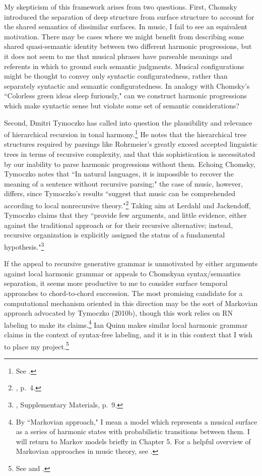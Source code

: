 My skepticism of this framework arises from two questions.  First, Chomsky introduced the separation of deep structure from surface structure to account for the shared semantics of dissimilar surfaces.  In music, I fail to see an equivalent motivation.  There may be cases where we might benefit from describing some shared quasi-semantic identity between two different harmonic progressions, but it does not seem to me that musical phrases have parseable meanings and referents in which to ground such semantic judgments.  Musical configurations might be thought to convey only syntactic configuratedness, rather than separately syntactic and semantic configuratedness.  In analogy with Chomsky's ``Colorless green ideas sleep furiously," can we construct harmonic progressions which make syntactic sense but violate some set of semantic considerations?

Second, Dmitri Tymoczko has called into question the plausibility and relevance of hierarchical recursion in tonal harmony.\footnote{See \cite{tymoczko2010local}.}  He notes that the hierarchical tree structures required by parsings like Rohrmeier's greatly exceed accepted linguistic trees in terms of recursive complexity, and that this sophistication is necessitated by our inability to parse harmonic progressions without them.  Echoing Chomsky, Tymoczko notes that ``In natural languages, it is impossible to recover the meaning of a sentence without recursive parsing;" the case of music, however, differs, since Tymoczko's results ``suggest that music can be comprehended according to local nonrecursive theory."\footnote{\cite{tymoczko2010local}, p.\ 4.}  Taking aim at Lerdahl and Jackendoff, Tymoczko claims that they ``provide few arguments, and little evidence, either against the traditional approach or for their recursive alternative; instead, recursive organization is explicitly assigned the status of a fundamental hypothesis."\footnote{\cite{tymoczko2010local}, Supplementary Materials, p.\ 9.}

If the appeal to recursive generative grammar is unmotivated by either arguments against local harmonic grammar or appeals to Chomskyan syntax/semantics separation, it seems more productive to me to consider surface temporal approaches to chord-to-chord succession.  The most promising candidate for a computational mechanism oriented in this direction may be the sort of Markovian approach advocated by Tymoczko (2010b), though this work relies on RN labeling to make its claims.\footnote{By ``Markovian approach," I mean a model which represents a musical surface as a series of harmonic states with probabilistic transitions between them.  I will return to Markov models briefly in Chapter 5.  For a helpful overview of Markovian approaches in music theory, see \cite{white2013}.}  Ian Quinn makes similar local harmonic grammar claims in the context of syntax-free labeling, and it is in this context that I wish to place my project.\footnote{See \cite{quinn2010} and \cite{quinn2011}.}

